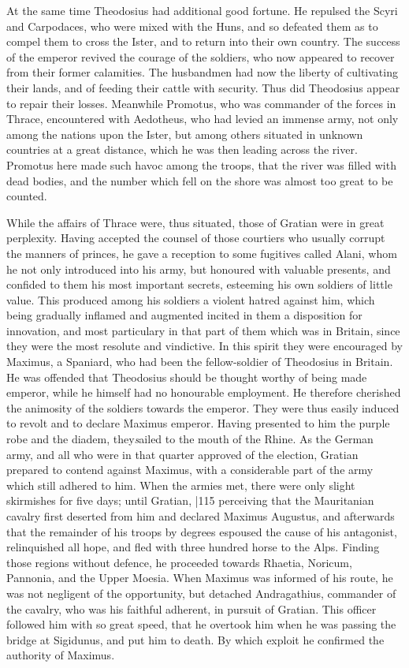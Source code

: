 At the same time Theodosius had additional good fortune. He repulsed the Scyri and Carpodaces, who were mixed with the Huns, and so defeated them as to compel them to cross the Ister, and to return into their own country. The success of the emperor revived the courage of the soldiers, who now appeared to recover from their former calamities. The husbandmen had now the liberty of cultivating their lands, and of feeding their cattle with security. Thus did Theodosius appear to repair their losses. Meanwhile Promotus, who was commander of the forces in Thrace, encountered with Aedotheus, who had levied an immense army, not only among the nations upon the Ister, but among others situated in unknown countries at a great distance, which he was then leading across the river. Promotus here made such havoc among the troops, that the river was filled with dead bodies, and the number which fell on the shore was almost too great to be counted.

While the affairs of Thrace were, thus situated, those of Gratian were in great perplexity. Having accepted the counsel of those courtiers who usually corrupt the manners of princes, he gave a reception to some fugitives called Alani, whom he not only introduced into his army, but honoured with valuable presents, and confided to them his most important secrets, esteeming his own soldiers of little value. This produced among his soldiers a violent hatred against him, which being gradually inflamed and augmented incited in them a disposition for innovation, and most particulary in that part of them which was in Britain, since they were the most resolute and vindictive. In this spirit they were encouraged by Maximus, a Spaniard, who had been the fellow-soldier of Theodosius in Britain. He was offended that Theodosius should be thought worthy of being made emperor, while he himself had no honourable employment. He therefore cherished the animosity of the soldiers towards the emperor. They were thus easily induced to revolt and to declare Maximus emperor. Having presented to him the purple robe and the diadem, they\emph{s}ailed to the mouth of the Rhine. As the German army, and all who were in that quarter approved of the election, Gratian prepared to contend against Maximus, with a considerable part of the army which still adhered to him. When the armies met, there were only slight skirmishes for five days; until Gratian,
|115
perceiving that the Mauritanian cavalry first deserted from him and declared Maximus Augustus, and afterwards that the remainder of his troops by degrees espoused the cause of his antagonist, relinquished all hope, and fled with three hundred horse to the Alps. Finding those regions without defence, he proceeded towards Rhaetia, Noricum, Pannonia, and the Upper Moesia. When Maximus was informed of his route, he was not negligent of the opportunity, but detached Andragathius, commander of the cavalry, who was his faithful adherent, in pursuit of Gratian. This officer followed him with so great speed, that he overtook
him when he was passing the bridge at Sigidunus, and put him to death. By which exploit he confirmed the authority of Maximus.


